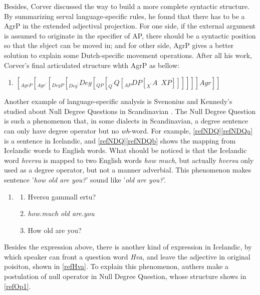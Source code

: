 \documentclass{ctexart}
\let \cite \parencite
\begin{document}
Besides, Corver discussed the way to build a more complete syntactic structure. By summarizing serval language-specific rules, he found that there has to be a AgrP in the extended adjectival projection. For one side, if the external argument is assumed to originate in the specifier of AP, there should be a syntactic position so that the sbject can be moved in; and for other side, AgrP gives a better solution to explain some Dutch-specific movement operations. After all his work, Corver's final articulated structure whth AgrP as bellow:

\begin{enumerate}[resume]
\item

$[_{AgrP}[_{Agr^{\prime}}[_{DegP}[_{Deg^{\prime}}Deg[_{QP}[_{Q^{\prime}} Q [_{AP}DP[_{X^{\prime}}A \enspace XP]]]]]]Agr]]$
    
\end{enumerate}

Another example of language-specific analysis is Svenonius and Kennedy's studied about Null Degree Questions in Scandinavian \cite{svenonius2006}. The Null Degree Question is such a phenomenon that, in some dialects in Scandinavian, a degree sentence can only have degree operator but no \textit{wh}-word. For example, \ref{refNDQ}\ref{refNDQa} is a sentence in Icelandic, and \ref{refNDQ}\ref{refNDQb} shows the mapping from Icelandic words to English words. What should be noticed is that the Icelandic word \textit{hversu} is mapped to two English words \textit{how much}, but actually \textit{hversu} only used as a degree operator, but not a manner adverbial. This phenomenon makes sentence '\textit{how old are you?}' sound like '\textit{old are you?}'. 

\begin{enumerate}[resume]
\item \label{refNDQ}
\begin{enumerate}
\item \label{refNDQa} Hversu gammall ertu? 
\item \label{refNDQb} \textit{how.much old are.you}
\item \label{refNDQc} How old are you?
\end{enumerate}
\end{enumerate}

Besides the expression above, there is another kind of expression in Icelandic, by which speaker can front a question word \textit{Hva\dh}, and leave the adjective in original poisiton, shown in \ref{refHva}. To explain this phenomenon, authers make a postulation of null operator in Null Degree Question, whose structure shows in \ref{refOp1}.
\end{document}
